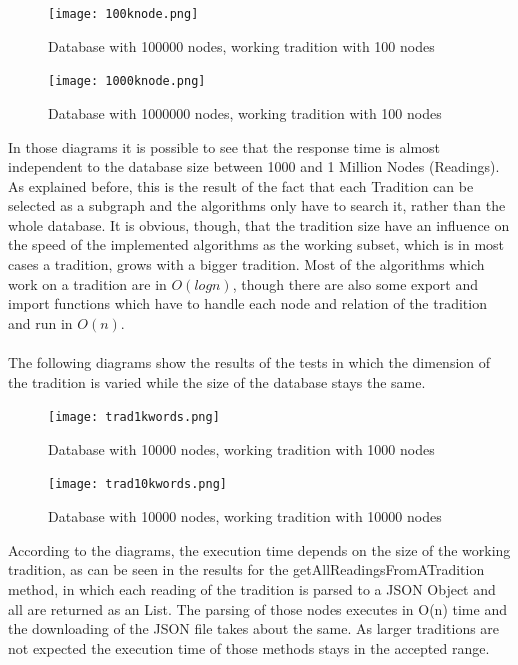 \documentclass[11pt,fleqn,openany]{book} %
\begin{document}
\begin{figure}[h!]
  \caption{Database with 100000 nodes,  working tradition with 100 nodes }
  \centering
    \texttt{[image: 100knode.png]}
\end{figure}

\begin{figure}[h!]
  \caption{Database with 1000000 nodes,  working tradition with 100 nodes }
  \centering
    \texttt{[image: 1000knode.png]}
\end{figure}
In those diagrams it is possible to see that the response time is almost independent to the database size between 1000 and 1 Million Nodes (Readings). As explained before, this is the result of the fact that each Tradition can be selected as a subgraph and the algorithms only have to search it, rather than the whole database. It is obvious, though, that the tradition size have an influence on the speed of the implemented algorithms as the working subset, which is in most cases a tradition, grows with a bigger tradition. Most of the algorithms which work on a tradition are in $O(log n)$, though there are also some export and import functions which have to handle each node and relation of the tradition and run in $O(n)$. 
\\ \quad \\
The following diagrams show the results of the tests in which the dimension of the tradition is varied while the size of the database stays the same. 
\begin{figure}[h!]
  \caption{Database with 10000 nodes,  working tradition with 1000 nodes }
  \centering
    \texttt{[image: trad1kwords.png]}
\end{figure}
\begin{figure}[h!]
  \caption{Database with 10000 nodes,  working tradition with 10000 nodes }
  \centering
    \texttt{[image: trad10kwords.png]}
\end{figure}
According to the diagrams, the execution time depends on the size of the working tradition, as can be seen in the results for the getAllReadingsFromATradition method, in which each reading of the tradition is parsed to a JSON Object and all are returned as an List. The parsing of those nodes executes in O(n) time and the downloading of the JSON file takes about the same. As larger traditions are not expected the execution time of those methods stays in the accepted range.

\end{document}
